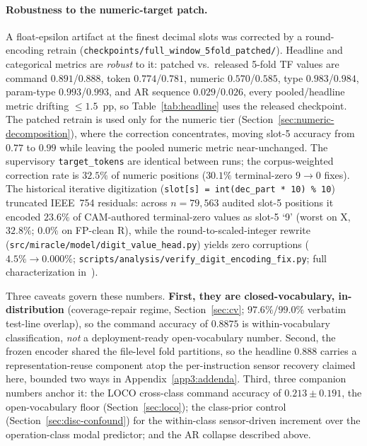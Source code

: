 \documentclass[sensors,article,submit,moreauthors,pdftex]{Definitions/mdpi}
\begin{document}
\paragraph{Robustness to the numeric-target patch.} A float-epsilon artifact at the finest decimal slots was corrected by a round-encoding retrain (\texttt{checkpoints/full\_window\_5fold\_patched/}). Headline and categorical metrics are \emph{robust} to it: patched vs.\ released 5-fold TF values are command $0.891$/$0.888$, token $0.774$/$0.781$, numeric $0.570$/$0.585$, type $0.983$/$0.984$, param-type $0.993$/$0.993$, and AR sequence $0.029$/$0.026$, every pooled/headline metric drifting $\le\!1.5$~pp, so Table~\ref{tab:headline} uses the released checkpoint. The patched retrain is used only for the numeric tier (Section~\ref{sec:numeric-decomposition}), where the correction concentrates, moving slot-5 accuracy from $0.77$ to $0.99$ while leaving the pooled numeric metric near-unchanged. The supervisory \texttt{target\_tokens} are identical between runs; the corpus-weighted correction rate is $32.5\%$ of numeric positions ($30.1\%$ terminal-zero $9\!\to\!0$ fixes). The historical iterative digitization (\texttt{slot[s] = int(dec\_part * 10) \% 10}) truncated IEEE~754 residuals: across $n\!=\!79{,}563$ audited slot-5 positions it encoded $23.6\%$ of CAM-authored terminal-zero values as slot-5 `9' (worst on X, $32.8\%$; $0.0\%$ on FP-clean R), while the round-to-scaled-integer rewrite (\texttt{src/miracle/model/digit\_value\_head.py}) yields zero corruptions ($4.5\%\!\to\!0.000\%$; \texttt{scripts/analysis/verify\_digit\_encoding\_fix.py}; full characterization in~\cite{paperB_entropy}).

Three caveats govern these numbers. \textbf{First, they are closed-vocabulary, in-distribution} (coverage-repair regime, Section~\ref{sec:cv}; $97.6\%$/$99.0\%$ verbatim test-line overlap), so the command accuracy of $0.8875$ is within-vocabulary classification, \emph{not} a deployment-ready open-vocabulary number. Second, the frozen encoder shared the file-level fold partitions, so the headline $0.888$ carries a representation-reuse component atop the per-instruction sensor recovery claimed here, bounded two ways in Appendix~\ref{app3:addenda}. Third, three companion numbers anchor it: the LOCO cross-class command accuracy of $0.213 \pm 0.191$, the open-vocabulary floor (Section~\ref{sec:loco}); the class-prior control (Section~\ref{sec:disc-confound}) for the within-class sensor-driven increment over the operation-class modal predictor; and the AR collapse described above.
\end{document}
